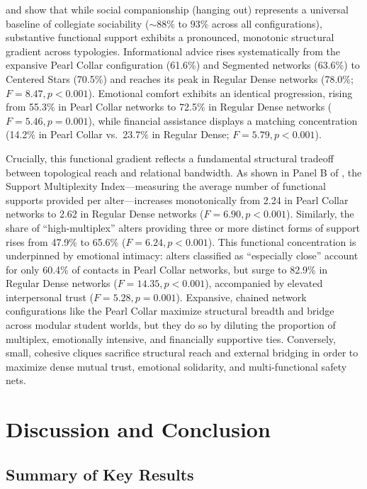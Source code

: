 \documentclass[12pt]{article}
\begin{document}
 and  show that while social companionship (hanging out) represents a universal baseline of collegiate sociability ($\sim 88\%$ to $93\%$ across all configurations), substantive functional support exhibits a pronounced, monotonic structural gradient across typologies. Informational advice rises systematically from the expansive Pearl Collar configuration (61.6\%) and Segmented networks (63.6\%) to Centered Stars (70.5\%) and reaches its peak in Regular Dense networks (78.0\%; $F = 8.47, p < 0.001$). Emotional comfort exhibits an identical progression, rising from 55.3\% in Pearl Collar networks to 72.5\% in Regular Dense networks ($F = 5.46, p = 0.001$), while financial assistance displays a matching concentration (14.2\% in Pearl Collar vs.\ 23.7\% in Regular Dense; $F = 5.79, p < 0.001$).

Crucially, this functional gradient reflects a fundamental structural tradeoff between topological reach and relational bandwidth. As shown in Panel B of , the Support Multiplexity Index---measuring the average number of functional supports provided per alter---increases monotonically from 2.24 in Pearl Collar networks to 2.62 in Regular Dense networks ($F = 6.90, p < 0.001$). Similarly, the share of ``high-multiplex'' alters providing three or more distinct forms of support rises from 47.9\% to 65.6\% ($F = 6.24, p < 0.001$). This functional concentration is underpinned by emotional intimacy: alters classified as ``especially close'' account for only 60.4\% of contacts in Pearl Collar networks, but surge to 82.9\% in Regular Dense networks ($F = 14.35, p < 0.001$), accompanied by elevated interpersonal trust ($F = 5.28, p = 0.001$). Expansive, chained network configurations like the Pearl Collar maximize structural breadth and bridge across modular student worlds, but they do so by diluting the proportion of multiplex, emotionally intensive, and financially supportive ties. Conversely, small, cohesive cliques sacrifice structural reach and external bridging in order to maximize dense mutual trust, emotional solidarity, and multi-functional safety nets.

\section{Discussion and Conclusion}

\subsection{Summary of Key Results}
\end{document}
